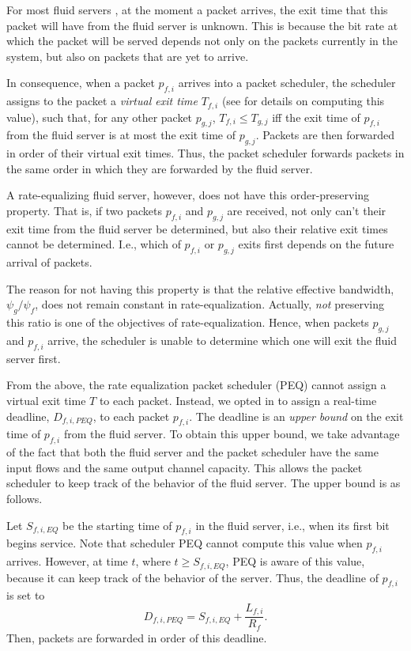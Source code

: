 \documentclass[conference]{IEEEtran}
\begin{document}
For most fluid servers 
\cite{Cobb-Universal-Timestamp-CN}\cite{GPS-Parekh}\cite{RP-Fair-Servers-ToN}, 
at the moment a packet arrives, the exit time that this packet will have from 
the fluid server is unknown. This is because the bit rate at which the packet 
will be served depends not only on the packets currently in the system, but 
also on packets that are yet to arrive.

In consequence, when a packet $p_{f,i}$ arrives into a packet scheduler, the 
scheduler assigns to the packet a {\em virtual exit time} $T_{f,i}$  (see  
\cite{GPS-Parekh} for details on computing this value), such that, for any 
other packet $p_{g,j}$, $T_{f,i} \leq T_{g,j}$ iff the exit time of $p_{f,i}$ 
from the fluid server is at most the exit time of $p_{g,j}$. Packets are then 
forwarded in order of their virtual exit times. Thus, the packet scheduler 
forwards packets in the same order in which they are forwarded by the fluid 
server.

A rate-equalizing fluid server, however, does not have this order-preserving 
property.  That is, if two packets $p_{f,i}$ and $p_{g,j}$ are received, not 
only can't their exit time from the fluid server be determined, but also their 
relative exit times cannot be determined. I.e., which of $p_{f,i}$ or $p_{g,j}$ 
exits first depends on the future arrival of packets. 

The reason for not having this property is that the relative effective 
bandwidth, $\psi_g/\psi_f$, does not remain constant in rate-equalization.  
Actually, {\em not} preserving this ratio is one of the objectives of 
rate-equalization. Hence, when packets $p_{g,j}$ and $p_{f,i}$ arrive, the 
scheduler is unable to determine which one will exit the fluid server first.

From the above, the rate equalization packet scheduler (PEQ) cannot assign a 
virtual exit time $T$ to each packet. Instead, we opted in \cite{Cobb-REQ} to 
assign a real-time deadline, $D_{f,i,PEQ}$, to each packet $p_{f,i}$. The 
deadline is an {\em upper bound} on the exit time of $p_{f,i}$ from the fluid 
server. To obtain this upper bound, we take advantage of the fact that both the 
fluid server and the packet scheduler have the same input flows and the same 
output channel capacity. This allows the packet scheduler to keep track of the 
behavior of the fluid server. The upper bound is as follows.

Let $S_{f,i,EQ}$ be the starting time of $p_{f,i}$ in the fluid server, i.e., 
when its first bit begins service. Note that scheduler PEQ cannot compute this 
value when $p_{f,i}$ arrives. However, at time $t$, where $t \geq S_{f,i,EQ}$, 
PEQ is aware of this value, because it can keep track of the behavior of the 
server. Thus, the deadline of $p_{f,i}$ is set to
\[D_{f,i,PEQ} = S_{f,i,EQ} + \frac{L_{f,i}}{R_{f}}.\]
Then, packets are forwarded in order of this deadline.
\end{document}
